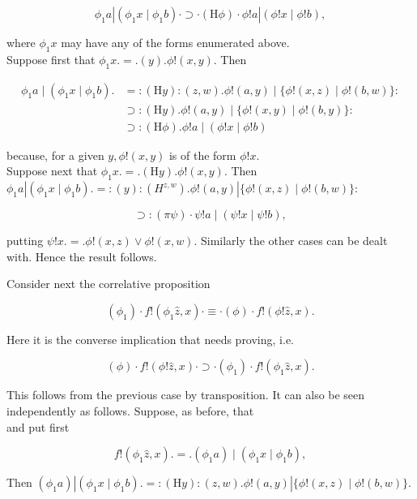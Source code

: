 \documentclass[10pt]{article}
\begin{document}
$$
\phi_{1} a\left|\left(\phi_{1} x \mid \phi_{1} b\right) \cdot \supset \cdot(\mathrm{H} \phi) \cdot \phi!a\right|(\phi!x \mid \phi!b),
$$

where $\phi_{1} x$ may have any of the forms enumerated above.\\
Suppose first that $\phi_{1} x .=.(y) . \phi!(x, y)$. Then

$$
\begin{aligned}
\phi_{1} a \mid\left(\phi_{1} x \mid \phi_{1} b\right) . & =:(\mathrm{H} y):(z, w) . \phi!(a, y) \mid\{\phi!(x, z) \mid \phi!(b, w)\}: \\
& \supset:(\mathrm{H} y) . \phi!(a, y) \mid\{\phi!(x, y) \mid \phi!(b, y)\}: \\
& \supset:(\mathrm{H} \phi) . \phi!a \mid(\phi!x \mid \phi!b)
\end{aligned}
$$

because, for a given $y, \phi!(x, y)$ is of the form $\phi!x$.\\
Suppose next that $\phi_{1} x .=.(\mathrm{H} y) . \phi!(x, y)$. Then\\
$\phi_{1} a\left|\left(\phi_{1} x \mid \phi_{1} b\right) .=:(y):\left(H^{z, w}\right) . \phi!(a, y)\right|\{\phi!(x, z) \mid \phi!(b, w)\}:$

$$
\supset:(\pi \psi) \cdot \psi!a \mid(\psi!x \mid \psi!b),
$$

putting $\psi!x .=. \phi!(x, z) \vee \phi!(x, w)$. Similarly the other cases can be dealt with. Hence the result follows.

Consider next the correlative proposition

$$
\left(\phi_{1}\right) \cdot f!\left(\phi_{1} \hat{z}, x\right) \cdot \equiv \cdot(\phi) \cdot f!(\phi!\hat{z}, x) .
$$

Here it is the converse implication that needs proving, i.e.

$$
(\phi) \cdot f!(\phi!\hat{z}, x) \cdot \supset \cdot\left(\phi_{1}\right) \cdot f!\left(\phi_{1} \hat{z}, x\right) .
$$

This follows from the previous case by transposition. It can also be seen independently as follows. Suppose, as before, that\\
and put first

$$
f!\left(\phi_{1} \hat{z}, x\right) .=.\left(\phi_{1} a\right) \mid\left(\phi_{1} x \mid \phi_{1} b\right),
$$

Then $\left(\phi_{1} a\right)\left|\left(\phi_{1} x \mid \phi_{1} b\right) .=:(\mathrm{H} y):(z, w) . \phi!(a, y)\right|\{\phi!(x, z) \mid \phi!(b, w)\}$.
\end{document}
